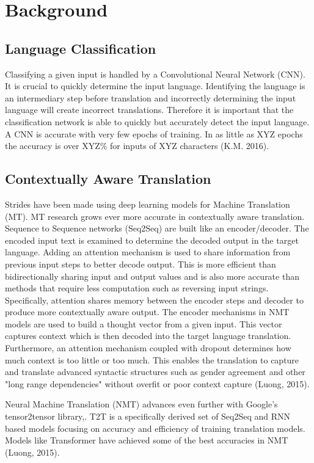 \documentclass[10pt,a4paper]{article}
\begin{document}
\section{Background}


\subsection{Language Classification}


Classifying a given input is handled by a Convolutional Neural Network (CNN). It is crucial to quickly determine the input language. Identifying the language is an intermediary step before translation and incorrectly determining the input language will create incorrect translations. Therefore it is important that the classification network is able to quickly but accurately detect the input language. A CNN is accurate with very few epochs of training. In as little as XYZ epochs the accuracy is over XYZ\% for inputs of XYZ characters (K.M. 2016).


\subsection{Contextually Aware Translation}


Strides have been made using deep learning models for Machine Translation (MT).  MT research grows ever more accurate in contextually aware translation. Sequence to Sequence networks (Seq2Seq) are built like an encoder/decoder. The encoded input text is examined to determine the decoded output in the target language. Adding an attention mechanism is used to share information from previous input steps to better decode output. This is more efficient than bidirectionally sharing input and output values and is also more accurate than methods that require less computation such as reversing input strings. Specifically, attention shares memory between the encoder steps and decoder to produce more contextually aware output. The encoder mechanisms in NMT models are used to build a thought vector from a given input. This vector captures context which is then decoded into the target language translation. Furthermore, an attention mechanism coupled with dropout determines how much context is too little or too much. This enables the translation to capture and translate advanced syntactic structures such as gender agreement and other "long range dependencies" without overfit or poor context capture (Luong, 2015).


Neural Machine Translation (NMT) advances even further with Google's tensor2tensor library,. T2T is a specifically derived set of Seq2Seq and RNN based models focusing on accuracy and efficiency of training translation models. Models like Transformer have achieved some of the best accuracies in NMT (Luong, 2015).
  
\end{document}
